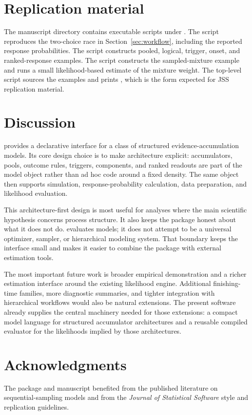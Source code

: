 \documentclass[article]{jss}
\newcommand{\pkgname}{\pkg{AccumulatR}}
\newcommand{\fct}[1]{\code{#1()}}
\begin{document}
\section{Replication material}
\label{sec:replication}

The manuscript directory contains executable  scripts under
. The script 
reproduces the two-choice race in Section~\ref{sec:workflow}, including the
reported response probabilities. The script 
constructs pooled, logical, trigger, onset, and ranked-response examples. The
script  constructs the sampled-mixture example
and runs a small likelihood-based estimate of the mixture weight. The top-level
 script sources the examples and prints \fct{sessionInfo}, which
is the form expected for JSS replication material.

\section{Discussion}
\label{sec:discussion}

\pkgname{} provides a declarative interface for a class of structured
evidence-accumulation models. Its core design choice is to make architecture
explicit: accumulators, pools, outcome rules, triggers, components, and ranked
readouts are part of the model object rather than ad hoc code around a fixed
density. The same object then supports simulation, response-probability
calculation, data preparation, and likelihood evaluation.

This architecture-first design is most useful for analyses where the main
scientific hypothesis concerns process structure. It also keeps the package
honest about what it does not do. \pkgname{} evaluates models; it does not
attempt to be a universal optimizer, sampler, or hierarchical modeling system.
That boundary keeps the interface small and makes it easier to combine the
package with external estimation tools.

The most important future work is broader empirical demonstration and a richer
estimation interface around the existing likelihood engine. Additional
finishing-time families, more diagnostic summaries, and tighter integration
with hierarchical workflows would also be natural extensions. The present
software already supplies the central machinery needed for those extensions: a
compact model language for structured accumulator architectures and a reusable
compiled evaluator for the likelihoods implied by those architectures.

\section*{Acknowledgments}

The package and manuscript benefited from the published literature on
sequential-sampling models and from the \emph{Journal of Statistical Software}
style and replication guidelines.


\end{document}
